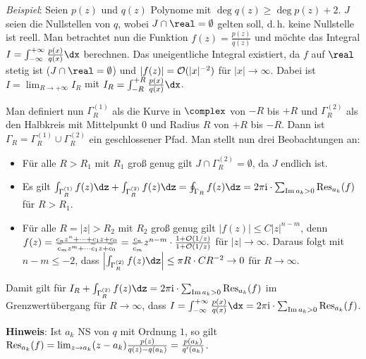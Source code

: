 \linie

\emph{Beispiel}:
Seien $p(z)$ und $q(z)$ Polynome mit $\deg q(z) \ge \deg p(z) + 2$.
$J$ seien die Nullstellen von $q$, wobei $J \cap \real = \emptyset$ gelten
soll, d.\,h. keine Nullstelle ist reell.
Man betrachtet nun die Funktion $f(z) = \frac{p(z)}{q(z)}$ und möchte
das Integral $I = \int_{-\infty}^{+\infty} \frac{p(x)}{q(x)} \dx$ berechnen.
Das uneigentliche Integral existiert, da $f$ auf $\real$ stetig ist
($J \cap \real = \emptyset$) und $|f(z)| = \mathcal{O}(|x|^{-2})$ für $|x| \to \infty$.
Dabei ist $I = \lim_{R \to +\infty} I_R$ mit
$I_R = \int_{-R}^{+R} \frac{p(x)}{q(x)} \dx$.

Man definiert nun $\Gamma_R^{(1)}$ als die Kurve in $\complex$
von $-R$ bis $+R$ und $\Gamma_R^{(2)}$ als den Halbkreis mit Mittelpunkt $0$
und Radius $R$ von $+R$ bis $-R$.
Dann ist $\Gamma_R = \Gamma_R^{(1)} \cup \Gamma_R^{(2)}$ ein
geschlossener Pfad.
Man stellt nun drei Beobachtungen an:
\begin{itemize}
    \item
    Für alle $R > R_1$ mit $R_1$ groß genug gilt
    $J \cap \Gamma_R^{(2)} = \emptyset$, da $J$ endlich ist.

    \item
    Es gilt $\int_{\Gamma_R^{(1)}} f(z)\dz + \int_{\Gamma_R^{(2)}} f(z)\dz =
    \oint_{\Gamma_R} f(z)\dz = 2\pi\i \cdot \sum_{\Im a_k > 0} \Res_{a_k}(f)$
    für $R > R_1$.

    \item
    Für alle $R = |z| > R_2$ mit $R_2$ groß genug gilt
    $|f(z)| \le C |z|^{n-m}$, denn\\
    $f(z) = \frac{c_n z^n + \dotsb + c_1 z + c_0}
    {\widetilde{c}_m z^m + \dotsb \widetilde{c}_1 z + \widetilde{c}_0} =
    \frac{c_n}{\widetilde{c}_m} z^{n-m} \cdot \frac{1 + \mathcal{O}(1/z)}{1 + \mathcal{O}(1/z)}$
    für $|z| \to \infty$.
    Daraus folgt mit $n - m \le -2$, dass
    $\left|\int_{\Gamma_R^{(2)}} f(z)\dz\right| \le \pi R \cdot CR^{-2} \to 0$
    für $R \to \infty$.
\end{itemize}

Damit gilt für $I_R + \int_{\Gamma_R^{(2)}} f(z)\dz =
2\pi\i \cdot \sum_{\Im a_k > 0} \Res_{a_k}(f)$ im Grenzwertübergang für
$R \to \infty$, dass
$I = \int_{-\infty}^{+\infty} \frac{p(x)}{q(x)} \dx =
2\pi\i \cdot \sum_{\Im a_k > 0} \Res_{a_k}(f)$.

\linie

\textbf{Hinweis}:
Ist $a_k$ NS von $q$ mit Ordnung $1$, so gilt
$\operatorname{Res}_{a_k}(f) = \lim_{z \to a_k} (z - a_k) \frac{p(z)}{q(z) - q(a_k)} =
\frac{p(a_k)}{q'(a_k)}$.

